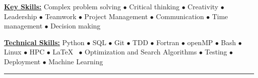 \vspace*{-5mm}
\begin{multicols}{2}
    \begin{spacing}{1}
        \href{.}{\bf Key Skills:}
        Complex problem solving $\bullet$ Critical thinking $\bullet$ Creativity $\bullet$ Leadership $\bullet$ Teamwork $\bullet$ Project Management $\bullet$ Communication $\bullet$ Time management $\bullet$ Decision making

        \href{.}{\bf Technical Skills:}
        Python $\bullet$ SQL $\bullet$ Git $\bullet$ TDD $\bullet$ Fortran $\bullet$ openMP $\bullet$ Bash $\bullet$ Linux $\bullet$ HPC $\bullet$ \LaTeX~ $\bullet$ Optimization and Search Algorithms $\bullet$ Testing $\bullet$ Deployment $\bullet$ Machine Learning
    \end{spacing}
\end{multicols}

\vspace*{-10mm}
\begin{center}
    \par\rule{1.0\textwidth}{0.6pt}
\end{center}
\vspace*{-2mm}